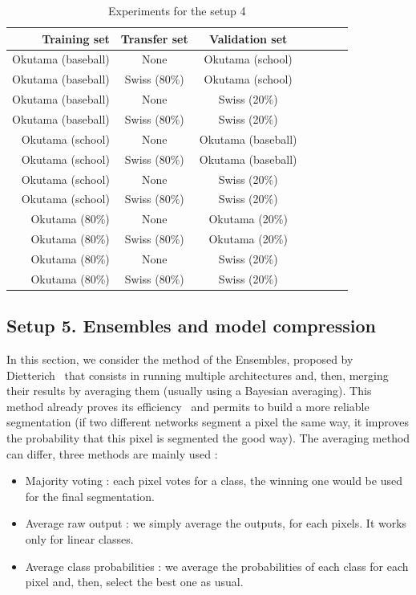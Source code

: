 \begin{table}[ht!]
  \centering
  
  \begin{tabular}{rcccccc}
  \rowcolor{gray!50}
  \toprule
  \textbf{Training set} & \textbf{Transfer set} & \textbf{Validation set} \\
  \midrule
  Okutama (baseball)		& None			& Okutama (school)	\\
  Okutama (baseball)		& Swiss (80\%)	& Okutama (school)	\\
  Okutama (baseball)		& None			& Swiss (20\%)		\\
  Okutama (baseball)		& Swiss (80\%)	& Swiss (20\%)		\\
  \midrule
  Okutama (school)		& None     		& Okutama (baseball) \\
  Okutama (school)    	& Swiss (80\%)  & Okutama (baseball) \\
  Okutama (school)    	& None     		& Swiss (20\%) 		\\
  Okutama (school)    	& Swiss (80\%)  & Swiss (20\%) 		\\
  \midrule
  Okutama (80\%)    		& None     		& Okutama (20\%)		\\
  Okutama (80\%)    		& Swiss (80\%)  & Okutama (20\%) 	\\
  Okutama (80\%)    		& None     		& Swiss (20\%) 		\\
  Okutama (80\%)    		& Swiss (80\%)	& Swiss (20\%) 		\\
  \bottomrule
  \end{tabular}%
  
  \caption{Experiments for the setup 4}
  \label{part3:setup4}
\end{table}%


\subsection*{Setup 5. Ensembles and model compression}
In this section, we consider the method of the Ensembles, proposed by Dietterich~\cite{DIET00} that consists in running multiple architectures and, then, merging their results by averaging them (usually using a Bayesian averaging). This method already proves its efficiency~\cite{MARM16} and permits to build a more reliable segmentation (if two different networks segment a pixel the same way, it improves the probability that this pixel is segmented the good way). The averaging method can differ, three methods are mainly used :
\begin{itemize}
\item Majority voting : each pixel votes for a class, the winning one would be used for the final segmentation.
\item Average raw output : we simply average the outputs, for each pixels. It works only for linear classes.
\item Average class probabilities : we average the probabilities of each class for each pixel and, then, select the best one as usual.
\end{itemize}

